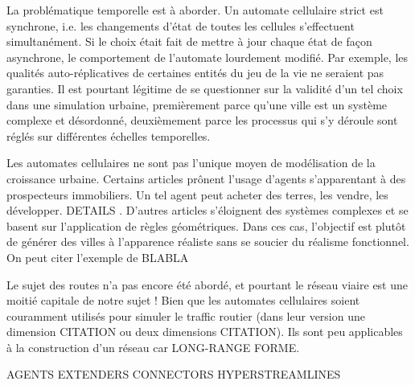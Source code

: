 \documentclass[10pt]{article}
\begin{document}
\begin{multicols}{2}
La problématique temporelle est à aborder. Un automate cellulaire
strict est synchrone, i.e. les changements d'état de toutes les
cellules s'effectuent simultanément. Si le choix était fait de mettre
à jour chaque état de façon asynchrone, le comportement de l'automate
lourdement modifié. Par exemple, les qualités auto-réplicatives de
certaines entités du jeu de la vie ne seraient pas garanties. Il est
pourtant légitime de se questionner sur la validité d'un tel choix
dans une simulation urbaine, premièrement parce qu'une ville est un
système complexe et désordonné, deuxièmement parce les processus qui
s'y déroule sont réglés sur différentes échelles temporelles.

Les automates cellulaires ne sont pas l'unique moyen de modélisation
de la croissance urbaine. Certains articles
\cite{Lechnera,Lechner2004} prônent l'usage d'agents s'apparentant à
des prospecteurs immobiliers. Un tel agent peut acheter des terres,
les vendre, les développer. DETAILS . D'autres articles s'éloignent
des systèmes complexes et se basent sur l'application de règles
géométriques. Dans ces cas, l'objectif est plutôt de générer des
villes à l'apparence réaliste sans se soucier du réalisme
fonctionnel. On peut citer l'exemple de BLABLA

Le sujet des routes n'a pas encore été abordé, et pourtant le réseau
viaire est une moitié capitale de notre sujet ! Bien que les automates
cellulaires soient couramment utilisés pour simuler le traffic routier
(dans leur version une dimension CITATION ou deux dimensions
CITATION). Ils sont peu applicables à la construction d'un réseau car
LONG-RANGE FORME.

AGENTS EXTENDERS CONNECTORS
HYPERSTREAMLINES

\end{multicols}
\end{document}
